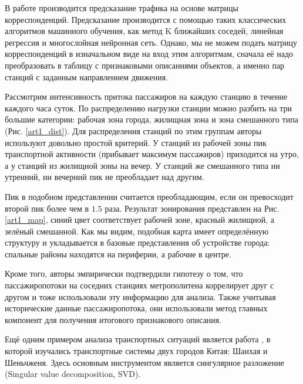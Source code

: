 \documentclass[12pt, fleqn, titlepage]{article}
\begin{document}
    В работе \cite{necr2019} производится предсказание трафика на основе матрицы корреспонденций. Предсказание производится  с 
    помощью таких классических алгоритмов машинного обучения, как метод K ближайших соседей, линейная регрессия и многослойная 
    нейронная сеть. Однако, мы не можем подать матрицу корреспонденций в изначальном виде на вход этим алгоритмам, сначала её 
    надо преобразовать в таблицу с признаковыми описаниями объектов, а именно пар станций с заданным направлением движения.

    Рассмотрим интенсивность притока пассажиров на каждую станцию в течение каждого часа суток. По распределению нагрузки 
    станции можно разбить на три большие категории: рабочая зона города, жилищная зона и зона смешанного типа (Рис. \ref{art1_dist}). 
    Для распределения станций по этим группам авторы используют довольно простой критерий. У станций из рабочей зоны пик 
    транспортной активности (прибывает максимум пассажиров) приходится на утро, а у станций из жилищной зоны на вечер. 
    У станций же смешанного типа ни утренний, ни вечерний пик не преобладает над другим.

    Пик в подобном представлении считается преобладающим, если он превосходит второй пик более чем в $1.5$ раза. Результат 
    зонирования представлен на Рис. \ref{art1_map}, синий цвет соответствует рабочей зоне, красный жилищной, а зелёный 
    смешанной. Как мы видим, подобная карта имеет определённую структуру и укладывается в 
    базовые представления об устройстве города: спальные районы находятся на периферии, а рабочие в центре.

    Кроме того, авторы эмпирически подтвердили гипотезу о том, что пассажиропотоки на соседних станциях метрополитена 
    коррелирует друг с другом и тоже использовали эту информацию для анализа. Также учитывая исторические данные 
    пассажиропотока, они использовали метод главных компонент для получения итогового признакового описания.

    Ещё одним примером анализа транспортных ситуаций является работа \cite{duan2018understanding}, в которой изучались 
    транспортные системы двух городов Китая: Шанхая и Шеньчженя. Здесь основным инструментом является сингулярное 
    разложение (Singular value decomposition, SVD).
\end{document}
